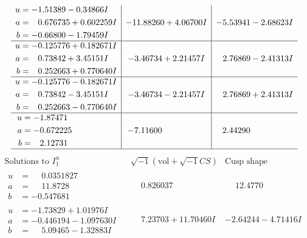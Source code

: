 \documentclass[1p]{elsarticle_modified}
\theoremstyle{definition}
\newcommand{\I}{\sqrt{-1}}
\begin{document}
$$\begin{array}{c|c|c}
\begin{aligned}
u &= -1.51389 - 0.34866 I \\
a &= \phantom{-}0.676735 + 0.602259 I \\
b &= -0.66800 - 1.79459 I\end{aligned}
 & -11.88260 + 4.06700 I & -5.53941 - 2.68623 I \\ \hline\begin{aligned}
u &= -0.125776 + 0.182671 I \\
a &= \phantom{-}0.73842 + 3.45151 I \\
b &= \phantom{-}0.252663 + 0.770640 I\end{aligned}
 & -3.46734 + 2.21457 I & \phantom{-}2.76869 - 2.41313 I \\ \hline\begin{aligned}
u &= -0.125776 - 0.182671 I \\
a &= \phantom{-}0.73842 - 3.45151 I \\
b &= \phantom{-}0.252663 - 0.770640 I\end{aligned}
 & -3.46734 - 2.21457 I & \phantom{-}2.76869 + 2.41313 I \\ \hline\begin{aligned}
u &= -1.87471\phantom{ +0.000000I} \\
a &= -0.672225\phantom{ +0.000000I} \\
b &= \phantom{-}2.12731\phantom{ +0.000000I}\end{aligned}
 & -7.11600\phantom{ +0.000000I} & \phantom{-}2.44290\phantom{ +0.000000I}\\
 \hline 
 \end{array}$$\newpage$$\begin{array}{c|c|c}  
\text{Solutions to }I^u_{1}& \I (\text{vol} + \sqrt{-1}CS) & \text{Cusp shape}\\
 \hline 
\begin{aligned}
u &= \phantom{-}0.0351827\phantom{ +0.000000I} \\
a &= \phantom{-}11.8728\phantom{ +0.000000I} \\
b &= -0.547681\phantom{ +0.000000I}\end{aligned}
 & \phantom{-}0.826037\phantom{ +0.000000I} & \phantom{-}12.4770\phantom{ +0.000000I} \\ \hline\begin{aligned}
u &= -1.73829 + 1.01976 I \\
a &= -0.446194 - 1.097630 I \\
b &= \phantom{-}5.09465 - 1.32883 I\end{aligned}
 & \phantom{-}7.23703 + 11.70460 I & -2.64244 - 4.71416 I \\ \hline\begin{aligned}

\end{aligned}
\end{array}$$
\end{document}
